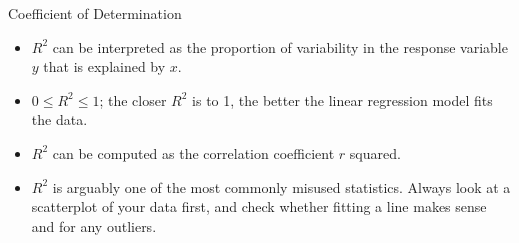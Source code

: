 \documentclass[10pt]{beamer}
\begin{document}
\begin{frame}{Coefficient of Determination}
\begin{itemize}
\item $R^2$ can be interpreted as the proportion of variability in the response variable $y$ that is explained by $x$.
\vspace{5pt}
\item $0 \leq R^2 \leq 1$; the closer $R^2$ is to 1, the better the linear regression model fits the data.
\vspace{5pt}
\item $R^2$ can be computed as the correlation coefficient $r$ squared.
\vspace{5pt}
\item $R^2$ is arguably one of the most commonly misused statistics.  Always look at a scatterplot of your data first, and check whether fitting a line makes sense and for any outliers.
\end{itemize}
\end{frame}

\end{document}
